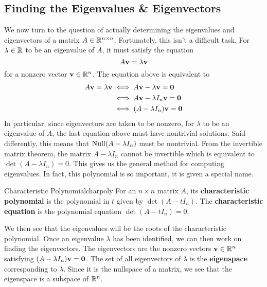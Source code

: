 \documentclass[colorful]{notes}
\begin{document}
    \subsection{Finding the Eigenvalues \& Eigenvectors}
    We now turn to the question of actually determining the eigenvalues and eigenvectors of a matrix $A \in \mathbb{R}^{n\times n}$. Fortunately, this isn't a difficult task. For $\lambda \in \mathbb{R}$ to be an eigenvalue of $A$, it must satisfy the equation 
    \begin{equation*}
        A \mathbf{v} = \lambda \mathbf{v} 
    \end{equation*}
    for a nonzero vector $\mathbf{v}\in \mathbb{R}^n$. The equation above is equivalent to 
    \begin{align*}
        A \mathbf{v} = \lambda \mathbf{v} &\iff A\mathbf{v} - \lambda \mathbf{v} = \mathbf{0} \\ 
        & \iff A \mathbf{v} - \lambda I_n \mathbf{v} = \mathbf{0} \\ 
        & \iff (A - \lambda I_n)\mathbf{v} = \mathbf{0}
    \end{align*}
    In particular, since eigenvectors are taken to be nonzero, for $\lambda$ to be an eigenvalue of $A$, the last equation above must have nontrivial solutions. Said differently, this means that $\operatorname{Null} (A - \lambda I_n)$ must be nontrivial. From the invertible matrix theorem, the matrix $A - \lambda I_n$ cannot be invertible which is equivalent to $\det (A - \lambda I_n) = 0$. This gives us the general method for computing eigenvalues. In fact, this polynomial is so important, it is given a special name. 
    \begin{cdefn}{Characteristic Polynomial}{charpoly}
        For an $n \times n$ matrix $A$, its \textbf{characteristic polynomial} is the polynomial in $t$ given by $\det (A - tI_n)$. The \textbf{characteristic equation} is the polynomial equation $\det(A - tI_n) = 0$. 
    \end{cdefn}
    We then see that the eigenvalues will be the roots of the characteristic polynomial. Once an eigenvalue $\lambda$ has been identified, we can then work on finding the eigenvectors. The eigenvectors are the nonzero vectors $\mathbf{v}\in \mathbb{R}^n$ satisfying $(A - \lambda I_n)\mathbf{v} = \mathbf{0}$. The set of all eigenvectors of $\lambda$ is the \textbf{eigenspace} corresponding to $\lambda$. Since it is the nullspace of a matrix, we see that the eigenspace is a subspace of $\mathbb{R}^n$. 
\end{document}
